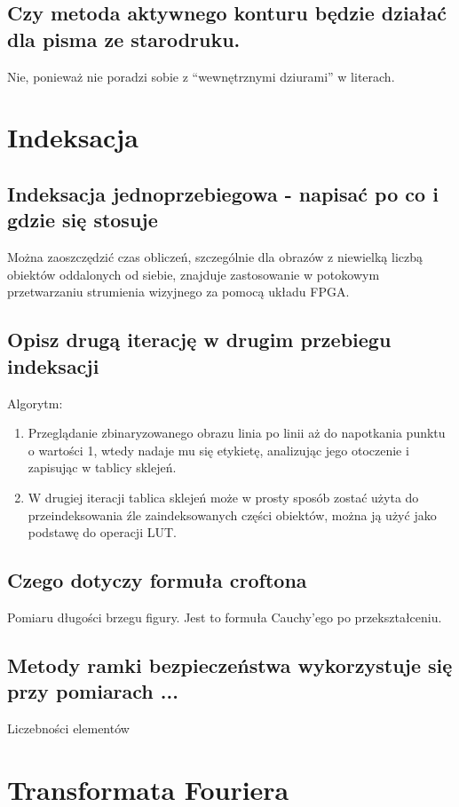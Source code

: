 \documentclass[a4paper, 12pt, titlepage]{article}
\begin{document}
\subsection{Czy metoda aktywnego konturu będzie działać dla pisma ze starodruku.}
Nie, ponieważ nie poradzi sobie z “wewnętrznymi dziurami” w literach.
\pagebreak\section{Indeksacja}

\subsection{Indeksacja jednoprzebiegowa - napisać po co i gdzie się stosuje}
Można zaoszczędzić czas obliczeń, szczególnie dla obrazów z niewielką liczbą obiektów oddalonych od siebie, znajduje zastosowanie w potokowym przetwarzaniu strumienia wizyjnego za pomocą układu FPGA.

\subsection{Opisz drugą iterację w drugim przebiegu indeksacji}
Algorytm:
\begin{enumerate}[noitemsep]
	\item Przeglądanie zbinaryzowanego obrazu linia po linii aż do napotkania punktu o wartości 1, wtedy nadaje mu się etykietę, analizując jego otoczenie i zapisując w tablicy sklejeń. 
	\item W drugiej iteracji tablica sklejeń może w prosty sposób zostać użyta do przeindeksowania źle zaindeksowanych części obiektów, można ją użyć jako podstawę do operacji LUT.
\end{enumerate}

\subsection{Czego dotyczy formuła croftona}
Pomiaru długości brzegu figury. Jest to formuła Cauchy’ego po przekształceniu.

\subsection{Metody ramki bezpieczeństwa wykorzystuje się przy pomiarach ...} Liczebności elementów
\pagebreak\section{Transformata Fouriera}
\end{document}
